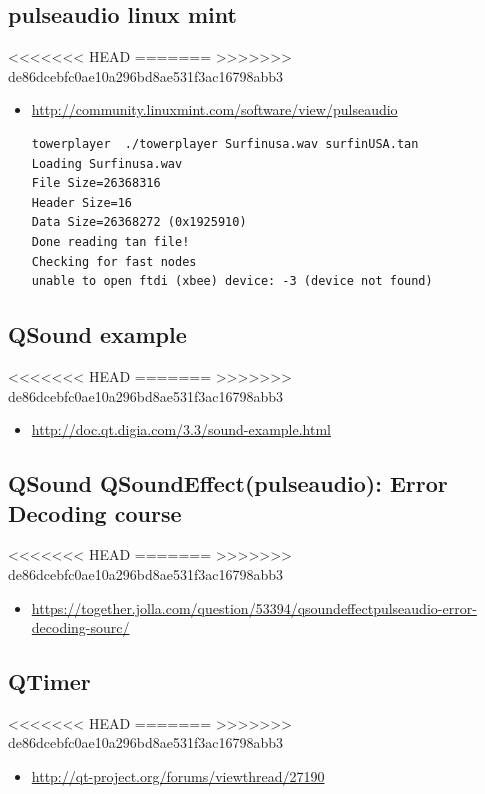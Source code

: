 \documentclass[9pt,b5paper]{article}
\begin{document}
\subsection{pulseaudio linux mint}
<<<<<<< HEAD
\label{sec-18-15}
=======
\label{sec-17-15}
>>>>>>> de86dcebfc0ae10a296bd8ae531f3ac16798abb3
\begin{itemize}
\item \url{http://community.linuxmint.com/software/view/pulseaudio}
\lstset{language=c++,label= ,caption= ,numbers=none}
\begin{lstlisting}
towerplayer  ./towerplayer Surfinusa.wav surfinUSA.tan
Loading Surfinusa.wav
File Size=26368316
Header Size=16
Data Size=26368272 (0x1925910)
Done reading tan file!
Checking for fast nodes
unable to open ftdi (xbee) device: -3 (device not found)
\end{lstlisting}
\end{itemize}
\subsection{QSound example}
<<<<<<< HEAD
\label{sec-18-16}
=======
\label{sec-17-16}
>>>>>>> de86dcebfc0ae10a296bd8ae531f3ac16798abb3
\begin{itemize}
\item \url{http://doc.qt.digia.com/3.3/sound-example.html}
\end{itemize}
\subsection{QSound QSoundEffect(pulseaudio): Error Decoding course}
<<<<<<< HEAD
\label{sec-18-17}
=======
\label{sec-17-17}
>>>>>>> de86dcebfc0ae10a296bd8ae531f3ac16798abb3
\begin{itemize}
\item \url{https://together.jolla.com/question/53394/qsoundeffectpulseaudio-error-decoding-sourc/}
\end{itemize}
\subsection{QTimer}
<<<<<<< HEAD
\label{sec-18-18}
=======
\label{sec-17-18}
>>>>>>> de86dcebfc0ae10a296bd8ae531f3ac16798abb3
\begin{itemize}
\item \url{http://qt-project.org/forums/viewthread/27190}
\end{itemize}
\end{document}
